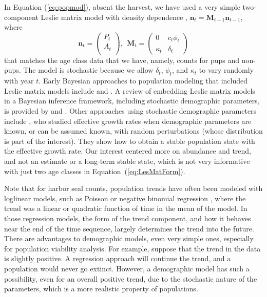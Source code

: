 \documentclass[12pt, titlepage]{article}\usepackage[]{graphicx}\usepackage[]{color}
\newcommand{\bn}{\ensuremath{{\boldsymbol{\eta}}}}
\def\bn{\mathbf{n}}
\def\bM{\mathbf{M}}
\begin{document}
In Equation (\ref{eq:popmod}), absent the harvest, we have used a very simple two-component Leslie matrix model with density dependence \citep[][p. 511]{Casw:matr:2001}, $\bn_t = \bM_{t-1}\bn_{t-1}$, where
\begin{equation} \label{eq:LesMatForm}
  \bn_t = \left(\begin{array}{c}
    P_t \\
    A_t \\
  \end{array}\right), \ \
  \bM_t = \left( \begin{array}{ll}
      0 & c_t\phi_t \\
      \kappa_t & \delta_t
  \end{array} \right)
\end{equation}
that matches the age class data that we have, namely, counts for pups and non-pups.  The model is stochastic \citep[][p. 452]{Wade:Baye:2002,Casw:matr:2001} because we allow $\delta_t$, $\phi_t$, and $\kappa_t$ to vary randomly with year $t$.  Early Bayesian approaches to population modeling that included Leslie matrix models include \citet{Raft:Give:Zeh:infe:1995} and \citet{Pool:Raft:infe:2000}. A review of embedding Leslie matrix models in a Bayesian inference framework, including stochastic demographic parameters, is provided by \citet{Gros:Crai:Hutc:Baye:2002} and \citet{Buck:Newm:Fern:Thom:embe:2007}.  Other approaches using stochastic demographic parameters include \citet{Cace:Cace:calc:2013}, who studied effective growth rates when demographic parameters are known, or can be assumed known, with random perturbations (whose distribution is part of the interest).  They show how to obtain a stable population state with the effective growth rate.  Our interest centered more on abundance and trend, and not an estimate or a long-term stable state, which is not very informative with just two age classes in Equation~(\ref{eq:LesMatForm}). 

Note that for harbor seal counts, population trends have often been modeled with loglinear models, such as Poisson or negative binomial regression \citep[see, e.g.,][]{Ver:Fros:baye:2003,Smal:Pend:Pitc:tren:2003,Math:Pend:decl:2006}, where the trend was a linear or quadratic function of time in the mean of the model. In those regression models, the form of the trend component, and how it behaves near the end of the time sequence, largely determines the trend into the future.  There are advantages to demographic models, even very simple ones, especially for population viability analysis. For example, suppose that the trend in the data is slightly positive.  A regression approach will continue the trend, and a population would never go extinct.  However, a demographic model has such a possibility, even for an overall positive trend, due to the stochastic nature of the parameters, which is a more realistic property of populations.
\end{document}
